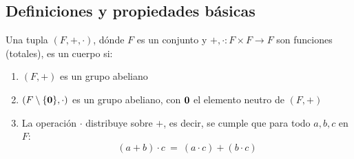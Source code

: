 \subsection{Definiciones y propiedades básicas}
\begin{definition}[Cuerpo]
Una tupla $(F, +,\cdot)$, dónde $F$ es un conjunto y $ +,\cdot :F\times F\to F$ son funciones (totales), es un cuerpo si:
\begin{enumerate}
	\item $(F,+)$ es un grupo abeliano

	\item $(F\setminus \{\mathbf{0}\},\cdot)$ es un grupo abeliano, con $\mathbf{0}$ el elemento neutro de $(F,+)$

   \item La operación $\cdot$ distribuye sobre $+$, es decir, se cumple que para todo $a,b,c$ en $F$:
    $$(a+b)\cdot c \ = \ (a \cdot c ) + (b\cdot c)$$
\end{enumerate}
\end{definition}

